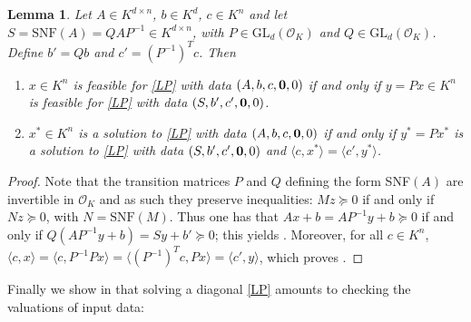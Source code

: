 \documentclass[sigconf]{acmart}
\newtheorem{lemma}[theorem]{Lemma}
\newcommand{\OK}{\mathcal{O}_K}
\newcommand{\GL}{\mathrm{GL}}
\providecommand{\DIFaddtex}[1]{{\protect\color{blue}\uwave{#1}}} %
\providecommand{\DIFdeltex}[1]{{\protect\color{red}\sout{#1}}}                      %
\providecommand{\DIFaddbegin}{} %
\providecommand{\DIFaddend}{} %
\providecommand{\DIFdelbegin}{} %
\providecommand{\DIFdelend}{} %
\providecommand{\DIFadd}[1]{\texorpdfstring{\DIFaddtex{#1}}{#1}} %
\providecommand{\DIFdel}[1]{\texorpdfstring{\DIFdeltex{#1}}{}} %
\newcommand{\DIFscaledelfig}{0.5}
\newlength{\DIFdelgraphicswidth} %
\newlength{\DIFdelgraphicsheight} %
\newcommand{\DIFaddincludegraphics}[2][]{{\color{blue}\fbox{\DIFOincludegraphics[#1]{#2}}}} %
\newcommand{\DIFdelincludegraphics}[2][]{%
\sbox{\DIFdelgraphicsbox}{\DIFOincludegraphics[#1]{#2}}%
\settoboxwidth{\DIFdelgraphicswidth}{\DIFdelgraphicsbox} %
\settoboxtotalheight{\DIFdelgraphicsheight}{\DIFdelgraphicsbox} %
\scalebox{\DIFscaledelfig}{%
\parbox[b]{\DIFdelgraphicswidth}{\usebox{\DIFdelgraphicsbox}\\[-\baselineskip] \rule{\DIFdelgraphicswidth}{0em}}\llap{\resizebox{\DIFdelgraphicswidth}{\DIFdelgraphicsheight}{%
\setlength{\unitlength}{\DIFdelgraphicswidth}%
\begin{picture}(1,1)%
\thicklines\linethickness{2pt} %
{\color[rgb]{1,0,0}\put(0,0){\framebox(1,1){}}}%
{\color[rgb]{1,0,0}\put(0,0){\line( 1,1){1}}}%
{\color[rgb]{1,0,0}\put(0,1){\line(1,-1){1}}}%
\end{picture}%
}\hspace*{3pt}}} %
} %
\DeclareRobustCommand{\DIFaddbegin}{\DIFOaddbegin \let\includegraphics\DIFaddincludegraphics} %
\DeclareRobustCommand{\DIFaddend}{\DIFOaddend \let\includegraphics\DIFOincludegraphics} %
\DeclareRobustCommand{\DIFdelbegin}{\DIFOdelbegin \let\includegraphics\DIFdelincludegraphics} %
\DeclareRobustCommand{\DIFdelend}{\DIFOaddend \let\includegraphics\DIFOincludegraphics} %
\begin{document}
\begin{lemma} \label{solsLP}
  Let $A \in K^{d\times n}$, $b \in K^d$, $c\in K^n$ and let
  $S = \mathrm{SNF}(A) = QAP^{-1} \in K^{d\times n}$, with
  \DIFdelbegin \DIFdel{$P \in \GL_d(\OK)$ }\DIFdelend \DIFaddbegin \DIFadd{$P \in \GL_n(\OK)$ }\DIFaddend and $Q\in \GL_d(\OK)$.
  Define $b' = Qb$ and $c' = (P^{-1})^Tc$.
  Then
   \begin{enumerate}
   \item \label{solsLP_item1}
     $x \in K^n$ is feasible for \eqref{LP} with data $(A,b,c,{\bf 0},0)$ if and only if $y = P x \in K^n$ is
     feasible for \eqref{LP} with data $(S,b',c',{\bf 0},0)$.
   \item \label{solsLP_item2}
     $x^* \in K^n$ is a solution to \eqref{LP} with data $(A,b,c,{\bf 0},0)$ if and only if $y^* = P x^*$ is
     a solution to \eqref{LP} with data $(S,b',c',{\bf 0},0)$ and $\langle c,x^* \rangle = \langle c',y^* \rangle$.
   \end{enumerate}
\end{lemma}
\begin{proof}
  Note that the transition matrices $P$ and $Q$ defining the form SNF$(A)$ are invertible in $\OK$
  and as such they preserve inequalities: $Mz \succeq 0$ if and only if $Nz \succeq 0$, with
  $N = \mathrm{SNF}(M)$. Thus one has that $Ax+b = AP^{-1}y +b \succeq 0$ if and only if
  $Q(AP^{-1}y + b) = Sy + b' \succeq 0$; this yields .
  Moreover, for all $c \in K^n$, $\langle c, x\rangle = \langle c, P^{-1}Px \rangle =
  \langle (P^{-1})^T c, Px \rangle = \langle c',y\rangle$, which proves
  .
\end{proof}

Finally we show in  that solving a diagonal \eqref{LP} amounts
to checking the valuations of input data:
\end{document}
